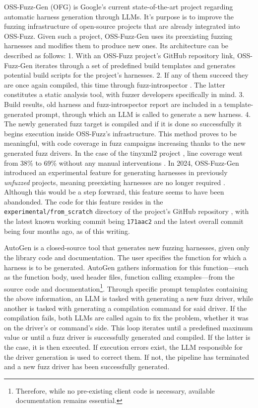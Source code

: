 \documentclass[
  a4paper,
]{scrreprt}
\theoremstyle{definition}
\theoremstyle{remark}
\begin{document}
OSS-Fuzz-Gen (OFG) \autocite{liu2023,oss-fuzz-gen} is Google's current
state-of-the-art project regarding automatic harness generation through
LLMs. It's purpose is to improve the fuzzing infrastructure of
open-source projects that are already integrated into OSS-Fuzz. Given
such a project, OSS-Fuzz-Gen uses its preexisting fuzzing harnesses and
modifies them to produce new ones. Its architecture can be described as
follows: 1. With an OSS-Fuzz project's GitHub repository link,
OSS-Fuzz-Gen iterates through a set of predefined build templates and
generates potential build scripts for the project's harnesses. 2. If any
of them succeed they are once again compiled, this time through
fuzz-introspector \autocite{fuzz-introspector}. The latter constitutes a
static analysis tool, with fuzzer developers specifically in mind. 3.
Build results, old harness and fuzz-introspector report are included in
a template-generated prompt, through which an LLM is called to generate
a new harness. 4. The newly generated fuzz target is compiled and if it
is done so successfully it begins execution inside OSS-Fuzz's
infrastructure. This method proves to be meaningful, with code coverage
in fuzz campaigns increasing thanks to the new generated fuzz drivers.
In the case of the tinyxml2 project \autocite{thomason2025}, line
coverage went from 38\% to 69\% without any manual interventions
\autocite{liu2023}. In 2024, OSS-Fuzz-Gen introduced an experimental
feature for generating harnesses in previously \emph{unfuzzed} projects,
meaning preexisting harnesses are no longer required
\autocite{oss-fuzzmaintainers2024}. Although this would be a step
forwrard, this feature seems to have been abandonded. The code for this
feature resides in the \texttt{experimental/from\_scratch} directory of
the project's GitHub repository \autocite{oss-fuzz-gen}, with the latest
known working commit being \texttt{171aac2} and the latest overall
commit being four months ago, as of this writing.

AutoGen \autocite{sun2024} is a closed-source tool that generates new
fuzzing harnesses, given only the library code and documentation. The
user specifies the function for which a harness is to be generated.
AutoGen gathers information for this function---such as the function
body, used header files, function calling examples---from the source
code and documentation\footnote{Therefore, while no pre-existing client
  code is necessary, available documentation remains essential.}.
Through specific prompt templates containing the above information, an
LLM is tasked with generating a new fuzz driver, while another is tasked
with generating a compilation command for said driver. If the
compilation fails, both LLMs are called again to fix the problem,
whether it was on the driver's or command's side. This loop iterates
until a predefined maximum value or until a fuzz driver is successfully
generated and compiled. If the latter is the case, it is then executed.
If execution errors exist, the LLM responsible for the driver generation
is used to correct them. If not, the pipeline has terminated and a new
fuzz driver has been successfully generated.
\end{document}
